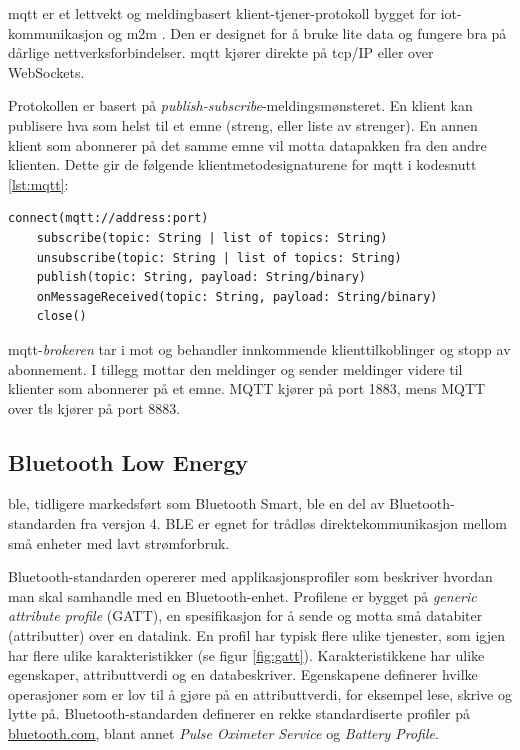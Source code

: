 \gls{mqtt} er et lettvekt og meldingbasert klient-tjener-protokoll bygget for \gls{iot}-kommunikasjon
og \gls{m2m} \citep{mqtt_standard}. Den er designet for å bruke lite data og fungere bra på
dårlige nettverksforbindelser. \gls{mqtt} kjører direkte på \gls{tcp}/IP eller over WebSockets.

Protokollen er basert på \textit{publish-subscribe}-meldingsmønsteret. En klient kan publisere hva som helst til
et emne (streng, eller liste av strenger). En annen klient som abonnerer på det samme emne
vil motta datapakken fra den andre klienten. Dette gir de følgende klientmetodesignaturene for \gls{mqtt}
i kodesnutt \ref{lst:mqtt}:

\begin{lstlisting}[frame=single, caption=Klientside-API for MQTT, label=lst:mqtt]
    connect(mqtt://address:port)
    subscribe(topic: String | list of topics: String)
    unsubscribe(topic: String | list of topics: String)
    publish(topic: String, payload: String/binary)
    onMessageReceived(topic: String, payload: String/binary)
    close()
\end{lstlisting}

\gls{mqtt}-\textit{brokeren} tar i mot og behandler innkommende klienttilkoblinger og stopp av abonnement. I tillegg
mottar den meldinger og sender meldinger videre til klienter som abonnerer på et emne. MQTT kjører på port 1883, mens
MQTT over \gls{tls} kjører på port 8883.

\subsection{Bluetooth Low Energy}
\gls{ble}, tidligere markedsført som Bluetooth Smart, ble en del av Bluetooth-standarden fra versjon 4. BLE er egnet
for trådløs direktekommunikasjon mellom små enheter med lavt strømforbruk.

Bluetooth-standarden opererer med applikasjonsprofiler som beskriver hvordan man skal samhandle med
en Bluetooth-enhet. Profilene er bygget på \textit{generic attribute profile} (GATT), en spesifikasjon for å sende og motta
små databiter (attributter) over en datalink. %
En profil har typisk flere ulike tjenester, som igjen har flere ulike karakteristikker (se figur \ref{fig:gatt}).
Karakteristikkene har ulike egenskaper, attributtverdi og en databeskriver. Egenskapene definerer hvilke operasjoner som er lov
til å gjøre på en attributtverdi, for eksempel lese, skrive og lytte på. Bluetooth-standarden definerer en rekke standardiserte
profiler på \url{bluetooth.com}, blant annet \textit{Pulse Oximeter Service} og \textit{Battery Profile}.

